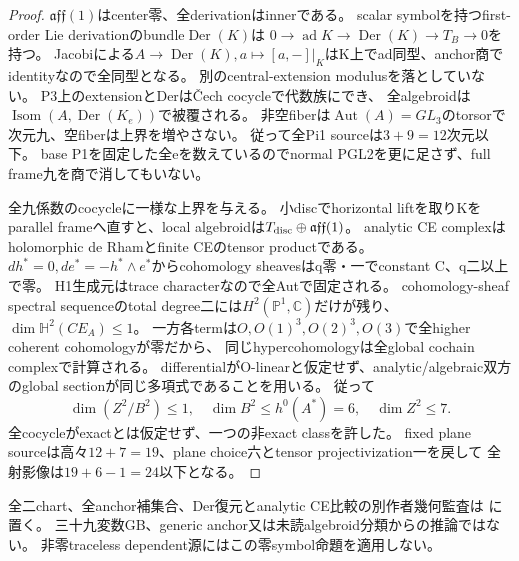 \documentclass[a4paper,11pt]{ltjsarticle}
\theoremstyle{definition}
\begin{document}
\begin{proof}
$\mathfrak{aff}(1)$はcenter零、全derivationはinnerである。
scalar symbolを持つfirst-order Lie derivationのbundle$\operatorname{Der}(K)$は
$0\to\operatorname{ad}K\to\operatorname{Der}(K)\to T_B\to0$を持つ。
Jacobiによる$A\to\operatorname{Der}(K),a\mapsto[a,-]|_K$はK上でad同型、anchor商でidentityなので全同型となる。
別のcentral-extension modulusを落としていない。
P3上のextensionとDerはČech cocycleで代数族にでき、
全algebroidは$\operatorname{Isom}(A,\operatorname{Der}(K_e))$で被覆される。
非空fiberは$\operatorname{Aut}(A)=GL_3$のtorsorで次元九、空fiberは上界を増やさない。
従って全Pi1 sourceは$3+9=12$次元以下。
base P1を固定した全eを数えているのでnormal PGL2を更に足さず、full frame九を商で消してもいない。

全九係数のcocycleに一様な上界を与える。
小discでhorizontal liftを取りKをparallel frameへ直すと、local algebroidは$T_{\rm disc}\oplus\mathfrak{aff}(1)$。
analytic CE complexはholomorphic de Rhamとfinite CEのtensor productである。
$dh^*=0,de^*=-h^*\wedge e^*$からcohomology sheavesはq零・一でconstant C、q二以上で零。
H1生成元はtrace characterなので全Autで固定される。
cohomology-sheaf spectral sequenceのtotal degree二には$H^2(\mathbb P^1,\mathbb C)$だけが残り、
$\dim\mathbb H^2(CE_A)\le1$。
一方各termは$O,O(1)^3,O(2)^3,O(3)$で全higher coherent cohomologyが零だから、
同じhypercohomologyは全global cochain complexで計算される。
differentialがO-linearと仮定せず、analytic/algebraic双方のglobal sectionが同じ多項式であることを用いる。
従って
\[
 \dim(Z^2/B^2)\le1,\quad\dim B^2\le h^0(A^*)=6,\quad\dim Z^2\le7.
\]
全cocycleがexactとは仮定せず、一つの非exact classを許した。
fixed plane sourceは高々$12+7=19$、plane choice六とtensor projectivization一を戻して
全射影像は$19+6-1=24$以下となる。
\end{proof}
全二chart、全anchor補集合、Der復元とanalytic CE比較の別作者幾何監査は
に置く。
三十九変数GB、generic anchor又は未読algebroid分類からの推論ではない。
非零traceless dependent源にはこの零symbol命題を適用しない。
\end{document}
